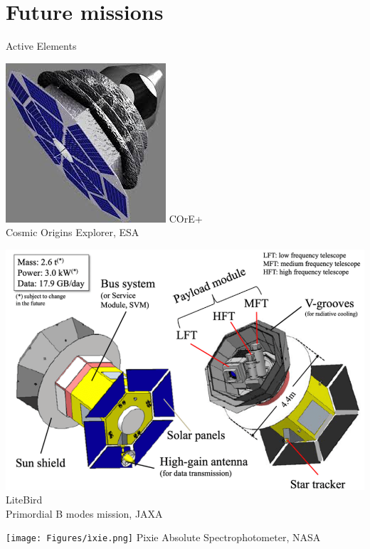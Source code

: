 \documentclass{cubeamer}
\begin{document}
\section{Future missions}
\begin{frame}{Active Elements}
\begin{minipage}{0.3\textwidth}
    \includegraphics[width=0.9\linewidth]{Figures/Core.jpg} 
    \small \centering  COrE+ \\ Cosmic Origins Explorer, ESA
\end{minipage}
\begin{minipage}{0.3\textwidth}
    \includegraphics[width=0.9\linewidth]{Figures/litebird.png} 
    \small \centering  LiteBird \\Primordial B modes mission, JAXA
\end{minipage}
\begin{minipage}{0.3\textwidth}
    \texttt{[image: Figures/ìxie.png]} 
    \small \centering  Pixie Absolute Spectrophotometer, NASA
\end{minipage}
\end{frame}
\end{document}
